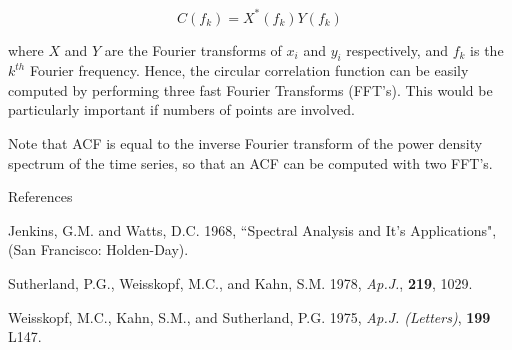 $$C(f_k) = X^{\ast}(f_k)Y(f_k)$$


{\list 
 
where $X$ and $Y$ are the Fourier transforms of $x_i$ and $y_i$ respectively,
and $f_k$ is the $k^{th}$ Fourier frequency.  Hence, the circular correlation
function can be easily computed by performing three fast Fourier Transforms
(FFT's).  This would be particularly important if numbers of points are
involved.

Note that ACF is equal to the inverse Fourier transform of the power
density spectrum of the time series, so that an ACF can be computed with two
FFT's.

}

\@{References}

Jenkins, G.M. and Watts, D.C. 1968, ``Spectral Analysis and It's Applications",
(San Francisco: Holden-Day).

Sutherland, P.G., Weisskopf, M.C., and Kahn, S.M. 1978, {\it Ap.J.}, {\bf 219}, 1029.

Weisskopf, M.C., Kahn, S.M., and Sutherland, P.G. 1975, {\it Ap.J. (Letters)},
{\bf 199} L147.


\vfill\eject
